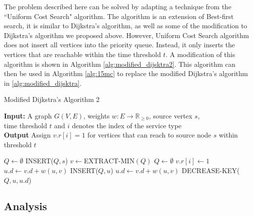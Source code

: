 The problem described here can be solved by adapting a technique from the ``Uniform Cost Search" algorithm. The algorithm is an extension of Best-first search, it is similar to Dijkstra's algorithm, as well as some of the modification to Dijkstra's algorithm we proposed above. However, Uniform Cost Search algorithm does not insert all vertices into the priority queue. Instead, it only inserts the vertices that are reachable within the time threshold $t$. A modification of this algorithm is shown in Algorithm \ref{alg:modified_dijsktra2}. This algorithm can then be used in Algorithm \ref{alg:15mc} to replace the modified Dijkstra's algorithm in \ref{alg:modified_dijsktra}.

\begin{algorithm}[H]
    \caption{Modified Dijkstra's Algorithm 2} \label{alg:modified_dijsktra2}
    \textbf{Input:} A graph $G(V,E)$, weights $w:E\rightarrow\mathbb{R}_{\geq 0}$, source vertex $s$, \\  time threshold $t$ and $i$ denotes the index of the service type\\
    \textbf{Output} Assign $v.r[i]=1$ for vertices that can reach to source node $s$ within threshold $t$ %
    \begin{algorithmic}
        \State $Q\gets\emptyset$ 
        \State INSERT($Q,s$)
            \State $v\gets$EXTRACT-MIN$(Q)$
                \State $Q\gets\emptyset$ 
            \Else
                \State $v.r[i] \gets 1$
                        \State $u.d\gets v.d+w(u,v)$ %
                        \State INSERT($Q,u$)
                        \State $u.d\gets v.d+w(u,v)$
                        \State DECREASE-KEY($Q,u,u.d$)
                    \EndIf
                \EndFor
            \EndIf
        \EndWhile
    \end{algorithmic}
\end{algorithm}

\subsection{Analysis}

